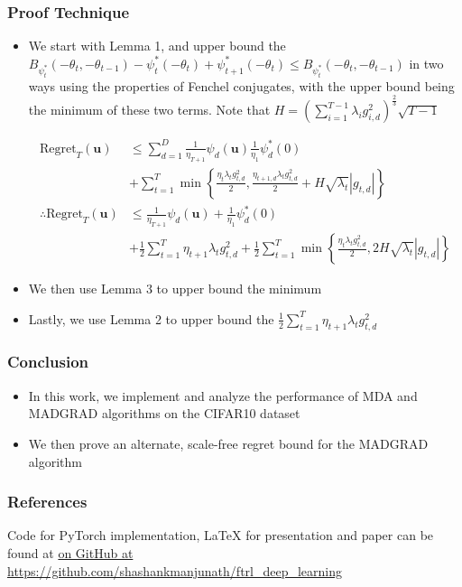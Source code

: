 \documentclass{beamer}
\newcommand{\Regret}{\text{Regret}}
\newcommand{\bu}{\mathbf{u}}
\begin{document}
\begin{frame}[shrink=20]
  \frametitle{Proof Technique}
  \begin{itemize}
    \item We start with Lemma 1, and upper bound the $B_{\psi_{t}^*}(-\theta_t, -\theta_{t-1}) - \psi_{t}^* (-\theta_t)
      + \psi_{t+1}^*(-\theta_t) \leq B_{\psi_{t}^*}(-\theta_t, -\theta_{t-1})$ in two ways using the properties of
      Fenchel conjugates, with the upper bound being the minimum of these two terms. Note that $H =
      \left(\sum\limits_{i=1}^{T-1} \lambda_i g_{i,d}^2\right)^\frac{2}{3} \sqrt{T-1}$

      \begin{align*}
        \Regret_T(\bu) &\leq \sum\limits_{d=1}^D \frac{1}{\eta_{T+1}}\psi_{d}(\bu) \frac{1}{\eta_1}\psi_{d}^*(0) \\
                       & + \sum\limits_{t=1}^T \min \left\{\frac{\eta_t \lambda_t g_{t,d}^2}{2}, \frac{\eta_{t+1,d}
                       \lambda_t g_{t,d}^2}{2} + H \sqrt{\lambda_t}|g_{t,d}|\right\} \\
        \therefore \Regret_T(\bu) &\leq \frac{1}{\eta_{T+1}}\psi_{d}(\bu) + \frac{1}{\eta_1}\psi_{d}^*(0) \\
                                  & +\frac{1}{2}\sum\limits_{t=1}^T \eta_{t+1} \lambda_t g_{t,d}^2 +
                                  \frac{1}{2}\sum\limits_{t=1}^T \min \left\{\frac{\eta_t \lambda_t g_{t,d}^2}{2},  2H
                                  \sqrt{\lambda_t}|g_{t,d}|\right\}
      \end{align*}

    \item We then use Lemma 3 to upper bound the minimum
    \item Lastly, we use Lemma 2 to upper bound the $\frac{1}{2}\sum\limits_{t=1}^T \eta_{t+1} \lambda_t g_{t,d}^2$
  \end{itemize}
\end{frame}

\begin{frame}
  \frametitle{Conclusion}
  \begin{itemize}
    \item In this work, we implement and analyze the performance of MDA and MADGRAD algorithms on the CIFAR10 dataset
    \item We then prove an alternate, scale-free regret bound for the MADGRAD algorithm
  \end{itemize}
\end{frame}

\begin{frame}[shrink=20]
  \frametitle{References}
  
  

  Code for PyTorch implementation, LaTeX for presentation and paper can be found at
  \href{https://github.com/shashankmanjunath/ftrl_deep_learning}{on GitHub at
  https://github.com/shashankmanjunath/ftrl\_deep\_learning}
\end{frame}
\end{document}
